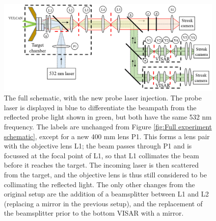 \begin{figure}
\begin{centering}
\includegraphics[width=1.0\textwidth]{figures/Experiment/SchematicsWithBackgrounds/FinalSchematic.png}%
\caption{\label{fig:Full experiment schematic with new laser setup} The full schematic, with the new probe laser injection. The probe laser is displayed in blue to differentiate the beampath from the reflected probe light shown in green, but both have the same 532 nm frequency. The labels are unchanged from Figure \ref{fig:Full experiment schematic}, except for a new 400 mm lens P1. This forms a lens pair with the objective lens L1; the beam passes through P1 and is focussed at the focal point of L1, so that L1 collimates the beam before it reaches the target. The incoming laser is then scattered from the target, and the objective lens is thus still considered to be collimating the reflected light. The only other changes from the original setup are the addition of a beamsplitter between L1 and L2 (replacing a mirror in the previous setup), and the replacement of the beamsplitter prior to the bottom VISAR with a mirror.}
\end{centering}
\end{figure}


